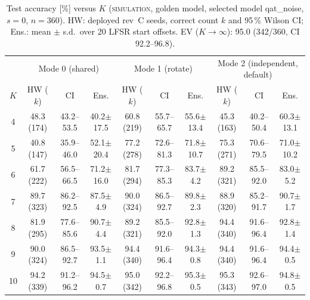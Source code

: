 \documentclass[conference]{IEEEtran}
\newcommand{\lbl}[1]{\textsc{#1}}    %
\begin{document}
\begin{table}[!t]
\centering
\caption{Test accuracy [\%] versus $K$ (\lbl{simulation}, golden model,
selected model qat\_noise, $s=0$, $n=360$). HW: deployed rev~C seeds, correct
count $k$ and 95\,\% Wilson CI; Ens.: mean $\pm$ s.d.\ over 20 LFSR start
offsets. EV ($K\to\infty$): 95.0 (342/360, CI 92.2--96.8).}
\label{tab:acc}
\setlength{\tabcolsep}{4.2pt}
\begin{tabular}{@{}c|ccc|ccc|ccc@{}}
\toprule
 & \multicolumn{3}{c|}{Mode 0 (shared)} & \multicolumn{3}{c|}{Mode 1 (rotate)} & \multicolumn{3}{c}{Mode 2 (independent, default)}\\
$K$ & HW ($k$) & CI & Ens. & HW ($k$) & CI & Ens. & HW ($k$) & CI & Ens.\\
\midrule
4  & 48.3 (174) & 43.2--53.5 & 40.2$\pm$17.5 & 60.8 (219) & 55.7--65.7 & 55.6$\pm$13.4 & 45.3 (163) & 40.2--50.4 & 60.3$\pm$13.1\\
5  & 40.8 (147) & 35.9--46.0 & 52.1$\pm$20.4 & 77.2 (278) & 72.6--81.3 & 71.8$\pm$10.7 & 75.3 (271) & 70.6--79.5 & 71.0$\pm$10.2\\
6  & 61.7 (222) & 56.5--66.5 & 71.2$\pm$16.0 & 81.7 (294) & 77.3--85.3 & 83.7$\pm$4.2 & 89.2 (321) & 85.5--92.0 & 83.0$\pm$5.2\\
7  & 89.7 (323) & 86.2--92.5 & 87.5$\pm$4.9 & 90.0 (324) & 86.5--92.7 & 89.8$\pm$2.3 & 88.9 (320) & 85.2--91.7 & 90.7$\pm$1.7\\
8  & 81.9 (295) & 77.6--85.6 & 90.7$\pm$4.4 & 89.2 (321) & 85.5--92.0 & 92.8$\pm$1.3 & 94.4 (340) & 91.6--96.4 & 92.8$\pm$1.4\\
9  & 90.0 (324) & 86.5--92.7 & 93.5$\pm$1.1 & 94.4 (340) & 91.6--96.4 & 94.3$\pm$0.8 & 94.4 (340) & 91.6--96.4 & 94.4$\pm$0.5\\
10 & 94.2 (339) & 91.2--96.2 & 94.5$\pm$0.7 & 95.0 (342) & 92.2--96.8 & 95.3$\pm$0.5 & 95.3 (343) & 92.6--97.0 & 94.8$\pm$0.5\\
\bottomrule
\end{tabular}
\end{table}
\end{document}
